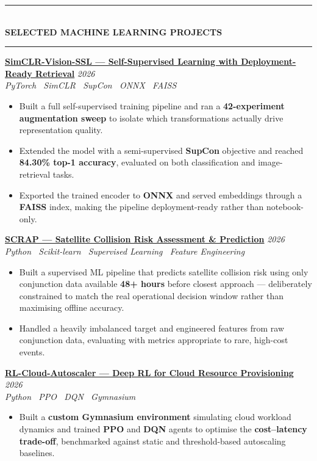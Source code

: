\documentclass[10pt, a4paper]{article}
\newcommand{\cvsection}[1]{%
  \vspace{3pt}%
  {\color{navy}\rule{\linewidth}{1.1pt}}\\[0.5pt]%
  {\color{navy}\bfseries\fontsize{9.5}{11}\selectfont\uppercase{#1}}\\[-4pt]%
  {\color{teal}\rule{\linewidth}{0.6pt}}%
  \vspace{2pt}%
}
\newcommand{\cvproject}[3]{%
  \vspace{2.5pt}%
  {\bfseries\color{navy}#1} \hfill {\color{midgray}\textit{#3}}\\[-1.5pt]%
  {\color{teal}\textit{#2}}%
}
\newenvironment{cvitems}{%
  \begin{itemize}[leftmargin=11pt, itemsep=0.5pt, parsep=0pt, topsep=1pt,
                  label={\textcolor{teal}{$\bullet$}}]
}{%
  \end{itemize}%
}
\begin{document}
\cvsection{Selected Machine Learning Projects}

\cvproject{\href{https://github.com/MahmoudAlyosify/SimCLR-Vision-SSL}{SimCLR-Vision-SSL --- Self-Supervised Learning with Deployment-Ready Retrieval}}
          {PyTorch \textperiodcentered\ SimCLR \textperiodcentered\ SupCon \textperiodcentered\ ONNX \textperiodcentered\ FAISS}
          {2026}
\begin{cvitems}
  \item Built a full self-supervised training pipeline and ran a \textbf{42-experiment augmentation sweep} to isolate which transformations actually drive representation quality.
  \item Extended the model with a semi-supervised \textbf{SupCon} objective and reached \textbf{84.30\% top-1 accuracy}, evaluated on both classification and image-retrieval tasks.
  \item Exported the trained encoder to \textbf{ONNX} and served embeddings through a \textbf{FAISS} index, making the pipeline deployment-ready rather than notebook-only.
\end{cvitems}

\cvproject{\href{https://github.com/MahmoudAlyosify/SCRAP-Satellite-Collision-Risk-Assessment-and-Prediction}{SCRAP --- Satellite Collision Risk Assessment \& Prediction}}
          {Python \textperiodcentered\ Scikit-learn \textperiodcentered\ Supervised Learning \textperiodcentered\ Feature Engineering}
          {2026}
\begin{cvitems}
  \item Built a supervised ML pipeline that predicts satellite collision risk using only conjunction data available \textbf{48+ hours} before closest approach --- deliberately constrained to match the real operational decision window rather than maximising offline accuracy.
  \item Handled a heavily imbalanced target and engineered features from raw conjunction data, evaluating with metrics appropriate to rare, high-cost events.
\end{cvitems}

\cvproject{\href{https://github.com/MahmoudAlyosify/RL-Cloud-Autoscaler}{RL-Cloud-Autoscaler --- Deep RL for Cloud Resource Provisioning}}
          {Python \textperiodcentered\ PPO \textperiodcentered\ DQN \textperiodcentered\ Gymnasium}
          {2026}
\begin{cvitems}
  \item Built a \textbf{custom Gymnasium environment} simulating cloud workload dynamics and trained \textbf{PPO} and \textbf{DQN} agents to optimise the \textbf{cost--latency trade-off}, benchmarked against static and threshold-based autoscaling baselines.
\end{cvitems}
\end{document}
